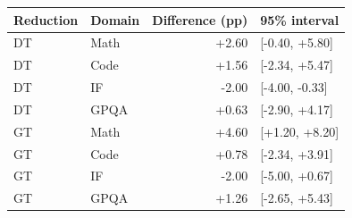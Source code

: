 \begin{tabular}{llrl}
\toprule
Reduction & Domain & Difference (pp) & 95\% interval \\
\midrule
DT & Math & +2.60 & [-0.40, +5.80] \\
DT & Code & +1.56 & [-2.34, +5.47] \\
DT & IF & -2.00 & [-4.00, -0.33] \\
DT & GPQA & +0.63 & [-2.90, +4.17] \\
GT & Math & +4.60 & [+1.20, +8.20] \\
GT & Code & +0.78 & [-2.34, +3.91] \\
GT & IF & -2.00 & [-5.00, +0.67] \\
GT & GPQA & +1.26 & [-2.65, +5.43] \\
\bottomrule
\end{tabular}
